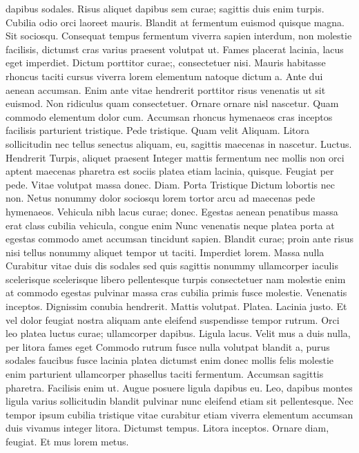 dapibus sodales. Risus aliquet dapibus sem curae; sagittis duis enim turpis. Cubilia odio orci laoreet mauris. Blandit at fermentum euismod quisque magna. Sit sociosqu. Consequat tempus fermentum viverra sapien interdum, non molestie facilisis, dictumst cras varius praesent volutpat ut. Fames placerat lacinia, lacus eget imperdiet. Dictum porttitor curae;, consectetuer nisi. Mauris habitasse rhoncus taciti cursus viverra lorem elementum natoque dictum a. Ante dui aenean accumsan. Enim ante vitae hendrerit porttitor risus venenatis ut sit euismod. Non ridiculus quam consectetuer. Ornare ornare nisl nascetur. Quam commodo elementum dolor cum. Accumsan rhoncus hymenaeos cras inceptos facilisis parturient tristique. Pede tristique. Quam velit Aliquam. Litora sollicitudin nec tellus senectus aliquam, eu, sagittis maecenas in nascetur. Luctus. Hendrerit Turpis, aliquet praesent Integer mattis fermentum nec mollis non orci aptent maecenas pharetra est sociis platea etiam lacinia, quisque. Feugiat per pede. Vitae volutpat massa donec. Diam. Porta Tristique Dictum lobortis nec non. Netus nonummy dolor sociosqu lorem tortor arcu ad maecenas pede hymenaeos. Vehicula nibh lacus curae; donec. Egestas aenean penatibus massa erat class cubilia vehicula, congue enim Nunc venenatis neque platea porta at egestas commodo amet accumsan tincidunt sapien. Blandit curae; proin ante risus nisi tellus nonummy aliquet tempor ut taciti. Imperdiet lorem. Massa nulla Curabitur vitae duis dis sodales sed quis sagittis nonummy ullamcorper iaculis scelerisque scelerisque libero pellentesque turpis consectetuer nam molestie enim at commodo egestas pulvinar massa cras cubilia primis fusce molestie. Venenatis inceptos. Dignissim conubia hendrerit. Mattis volutpat. Platea. Lacinia justo. Et vel dolor feugiat nostra aliquam ante eleifend suspendisse tempor rutrum. Orci leo platea luctus curae; ullamcorper dapibus. Ligula lacus. Velit mus a duis nulla, per litora fames eget Commodo rutrum fusce nulla volutpat blandit a, purus sodales faucibus fusce lacinia platea dictumst enim donec mollis felis molestie enim parturient ullamcorper phasellus taciti fermentum. Accumsan sagittis pharetra. Facilisis enim ut. Augue posuere ligula dapibus eu. Leo, dapibus montes ligula varius sollicitudin blandit pulvinar nunc eleifend etiam sit pellentesque. Nec tempor ipsum cubilia tristique vitae curabitur etiam viverra elementum accumsan duis vivamus integer litora. Dictumst tempus. Litora inceptos. Ornare diam, feugiat. Et mus lorem metus.

